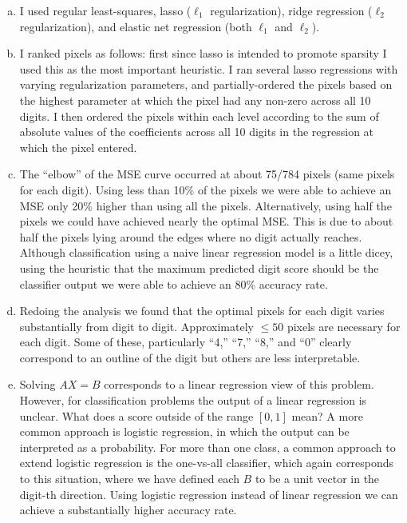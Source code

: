 \documentclass[letter, 12pt]{article}
\begin{document}
\begin{enumerate}[(a)]
\item I used regular least-squares, lasso ($\ell_1$ regularization), ridge regression ($\ell_2$ regularization), and elastic net regression (both $\ell_1$ and $\ell_2$).
\item I ranked pixels as follows: first since lasso is intended to promote sparsity I used this as the most important heuristic. I ran several lasso regressions with varying regularization parameters, and partially-ordered the pixels based on the highest parameter at which the pixel had any non-zero across all 10 digits. I then ordered the pixels within each level according to the sum of absolute values of the coefficients across all 10 digits in the regression at which the pixel entered.
\item The ``elbow'' of the MSE curve occurred at about 75/784 pixels (same pixels for each digit). Using less than 10\% of the pixels we were able to achieve an MSE only 20\% higher than using all the pixels. Alternatively, using half the pixels we could have achieved nearly the optimal MSE. This is due to about half the pixels lying around the edges where no digit actually reaches. Although classification using a naive linear regression model is a little dicey, using the heuristic that the maximum predicted digit score should be the classifier output we were able to achieve an 80\% accuracy rate.
\item Redoing the analysis we found that the optimal pixels for each digit varies substantially from digit to digit. Approximately $\leq 50$ pixels are necessary for each digit. Some of these, particularly ``4,'' ``7,'' ``8,'' and ``0'' clearly correspond to an outline of the digit but others are less interpretable. 
\item Solving $AX=B$ corresponds to a linear regression view of this problem. However, for classification problems the output of a linear regression is unclear. What does a score outside of the range $[0,1]$ mean? A more common approach is logistic regression, in which the output can be interpreted as a probability. For more than one class, a common approach to extend logistic regression is the one-vs-all classifier, which again corresponds to this situation, where we have defined each $B$ to be a unit vector in the digit-th direction. Using logistic regression instead of linear regression we can achieve a substantially higher accuracy rate.
\end{enumerate}


\pagebreak
\end{document}
